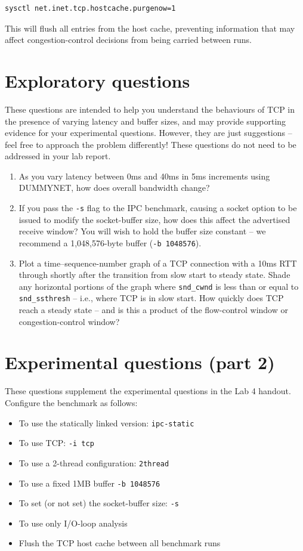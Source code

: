 \documentclass[a4paper,10pt]{article}
\begin{document}
\begin{verbatim}
sysctl net.inet.tcp.hostcache.purgenow=1
\end{verbatim}

\noindent
This will flush all entries from the host cache, preventing information that
may affect congestion-control decisions from being carried between runs.

\section*{Exploratory questions}

These questions are intended to help you understand the behaviours of TCP in
the presence of varying latency and buffer sizes, and may provide supporting
evidence for your experimental questions.
However, they are just suggestions -- feel free to approach the problem
differently!
These questions do not need to be addressed in your lab report.

\begin{enumerate}
  \item As you vary latency between 0ms and 40ms in 5ms increments using
    DUMMYNET, how does overall bandwidth change?
  \item If you pass the \texttt{-s} flag to the IPC benchmark, causing a
    socket option to be issued to modify the socket-buffer size, how does
    this affect the advertised receive window?  You will wish to hold the
    buffer size constant -- we recommend a 1,048,576-byte buffer
    (\texttt{-b 1048576}).
  \item Plot a time--sequence-number graph of a TCP connection with a 10ms
    RTT through shortly after the transition from slow start to steady state.
    Shade any horizontal portions of the graph where \texttt{snd\_cwnd} is
    less than or equal to \texttt{snd\_ssthresh} -- i.e., where TCP is in slow
    start.
    How quickly does TCP reach a steady state -- and is this a product of the
    flow-control window or congestion-control window?
\end{enumerate}

\section*{Experimental questions (part 2)}

These questions supplement the experimental questions in the Lab 4 handout.
Configure the benchmark as follows:

\begin{itemize}
\item To use the statically linked version: \texttt{ipc-static}
\item To use TCP: \texttt{-i tcp}
\item To use a 2-thread configuration: \texttt{2thread}
\item To use a fixed 1MB buffer \texttt{-b 1048576}
\item To set (or not set) the socket-buffer size: \texttt{-s}
\item To use only I/O-loop analysis
\item Flush the TCP host cache between all benchmark runs
\end{itemize}
\end{document}
